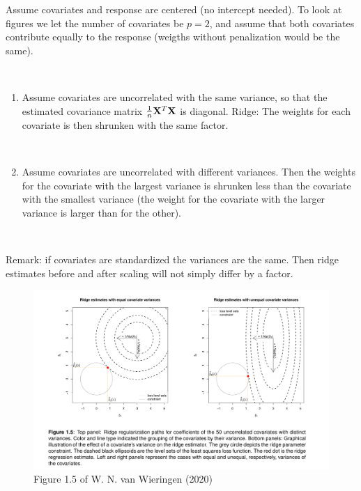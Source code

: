\documentclass[
  ignorenonframetext,
]{beamer}
\providecommand{\tightlist}{%
  \setlength{\itemsep}{0pt}\setlength{\parskip}{0pt}}
\begin{document}
\begin{frame}
Assume covariates and response are centered (no intercept needed). To
look at figures we let the number of covariates be \(p=2\), and assume
that both covariates contribute equally to the response (weigths without
penalization would be the same).

\(~\)

\begin{enumerate}
[1)]
\tightlist
\item
  Assume covariates are uncorrelated with the same variance, so that the
  estimated covariance matrix \(\frac{1}{n}{\bf X}^T{\bf X}\) is
  diagonal. Ridge: The weights for each covariate is then shrunken with
  the same factor.
\end{enumerate}

\(~\)

\begin{enumerate}
[1)]
\setcounter{enumi}{1}
\tightlist
\item
  Assume covariates are uncorrelated with different variances. Then the
  weights for the covariate with the largest variance is shrunken less
  than the covariate with the smallest variance (the weight for the
  covariate with the larger variance is larger than for the other).
\end{enumerate}

\(~\)
\end{frame}

\begin{frame}
Remark: if covariates are standardized the variances are the same. Then
ridge estimates before and after scaling will not simply differ by a
factor.
\end{frame}

\begin{frame}
\begin{figure}
\includegraphics[width=1\linewidth]{WNvWfig15bottom} \caption{Figure 1.5 of W. N. van Wieringen (2020)}\label{fig:unnamed-chunk-6}
\end{figure}
\end{frame}
\end{document}
